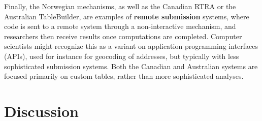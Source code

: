 Finally, the Norwegian mechanisms, as well as the Canadian RTRA \cite{statistics_canada_real_2021} or the Australian TableBuilder, are examples of \textbf{remote submission} systems, where code is sent to a remote system through a non-interactive mechanism, and researchers then receive results once computations are completed. Computer scientists might recognize this as a variant on application programming interfaces (APIs), used for instance for geocoding of addresses, but typically with less sophisticated submission systems. Both the Canadian and Australian systems are focused primarily on custom tables, rather than more sophisticated analyses.





\section{Discussion}



